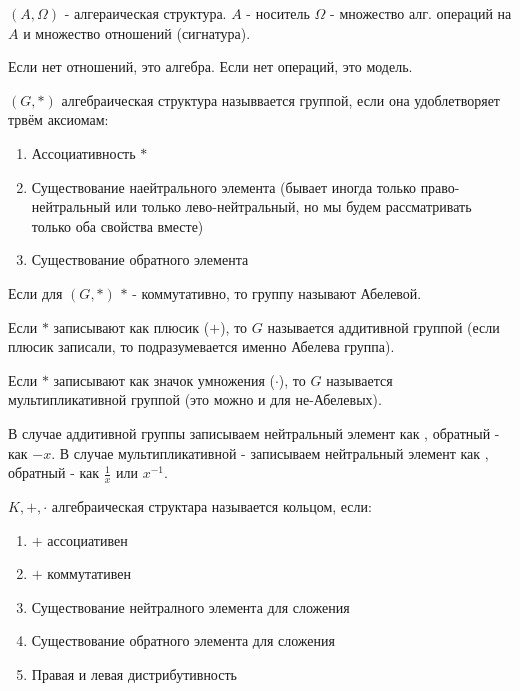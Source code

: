 \documentclass[12pt, a4paper]{article}
\begin{document}
    \begin{definition}
        $(A, \Omega)$ - алгераическая структура.
        $A$ - носитель
        $\Omega$ - множество алг. операций на $A$ и множество отношений (сигнатура).

        Если нет отношений, это алгебра.
        Если нет операций, это модель.
    \end{definition}

    \begin{definition}
        $(G, *)$ алгебраическая структура назыввается группой, если она удоблетворяет трвём аксиомам:
        \begin{enumerate}
            \item Ассоциативность $*$
            \item Существование наейтрального элемента 
            (бывает иногда только право-нейтральный или только лево-нейтральный, но мы будем рассматривать только оба свойства вместе)
            \item Существование обратного элемента
        \end{enumerate}
    \end{definition}

    \begin{definition}
        Если для $(G, *)$ $*$ - коммутативно, то группу называют Абелевой.

        Если $*$ записывают как плюсик ($+$), то $G$ называется аддитивной группой (если плюсик записали, то подразумевается именно Абелева группа).
        
        Если $*$ записывают как значок умножения ($\cdot$), то $G$ называется мультипликативной группой (это можно и для не-Абелевых).
    \end{definition}
    

    В случае аддитивной группы записываем нейтральный элемент как , обратный - как $-x$.
    В случае мультипликативной - записываем нейтральный элемент как , обратный - как $\frac{1}{x}$ или $x^{-1}$.

    \begin{definition}
        [Кольцо]
        $K, +, \cdot$ алгебраическая структара называется кольцом, если:
        \begin{enumerate}
            \item $+$ ассоциативен
            \item $+$ коммутативен
            \item Существование нейтралного элемента для сложения
            \item Существование обратного элемента для сложения
            \item Правая и левая дистрибутивность
        \end{enumerate}
    \end{definition}
\end{document}
